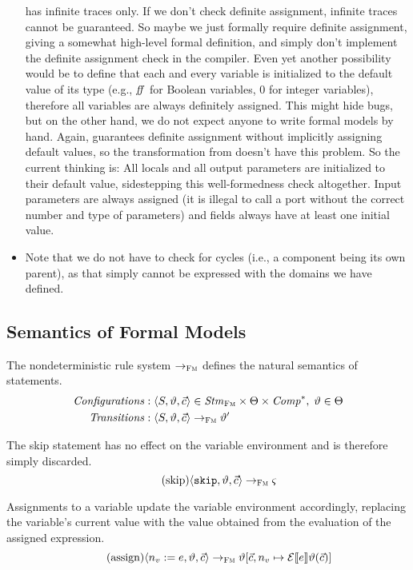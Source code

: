 \documentclass[a4paper,10pt,english]{article}
\begin{document}
\begin{itemize}
	has infinite traces only. If we don't check definite assignment, infinite traces cannot be guaranteed. So maybe we just formally
	require definite assignment, giving a somewhat high-level formal definition, and simply don't implement the definite assignment
	check in the \SSharp compiler. Even yet another possibility would be to define that each and every variable is initialized to the
	default value of its type (e.g., $\mathit{ff}$ for Boolean variables, $0$ for integer variables), therefore all variables are always
	definitely assigned. This might hide bugs, but on the other hand, we do not expect anyone to write formal models by hand. Again,
	\CSharp guarantees definite assignment without implicitly assigning default values, so the transformation from \CSharp doesn't
	have this problem. So the current thinking is: All locals and all output parameters are initialized to their default value,
	sidestepping this well-formedness check altogether. Input parameters are always assigned (it is illegal to call a port without
	the correct number and type of parameters) and fields always have at least one initial value.
	\item Note that we do not have to check for cycles (i.e., a component being its own parent), as that simply cannot be expressed
	with the domains we have defined.
\end{itemize}

\subsection{Semantics of Formal Models}
The nondeterministic rule system $\rightarrow_{\textsc{Fm}}$ defines the natural semantics of statements.
\begin{align*}
	\mathit{Configurations} : & \;\langle S, \vartheta, \vec{c} \rangle \in \mathit{Stm}_\textsc{Fm} \times \Theta \times
	\mathit{Comp}^*, \; \vartheta \in \Theta
	\\
	\mathit{Transitions} : & \;\langle S, \vartheta, \vec{c} \rangle \rightarrow_{\textsc{Fm}} \vartheta'
\end{align*}

The skip statement has no effect on the variable environment and is therefore simply discarded.
\begin{equation*}
	\tag{skip}
	\langle \mathtt{skip}, \vartheta, \vec{c} \rangle
		\rightarrow_{\textsc{Fm}}
	\varsigma
\end{equation*}

Assignments to a variable update the variable environment accordingly, replacing the variable's current value with the value
obtained from the evaluation of the assigned expression.
\begin{equation*}
	\tag{assign}
	\langle n_v\; \mathtt{:=}\; e, \vartheta, \vec{c} \rangle
		\rightarrow_{\textsc{Fm}}
	\vartheta[\vec{c}, n_v \mapsto \mathcal{E} \llbracket e \rrbracket \vartheta(\vec{c})]
\end{equation*}
\end{document}

